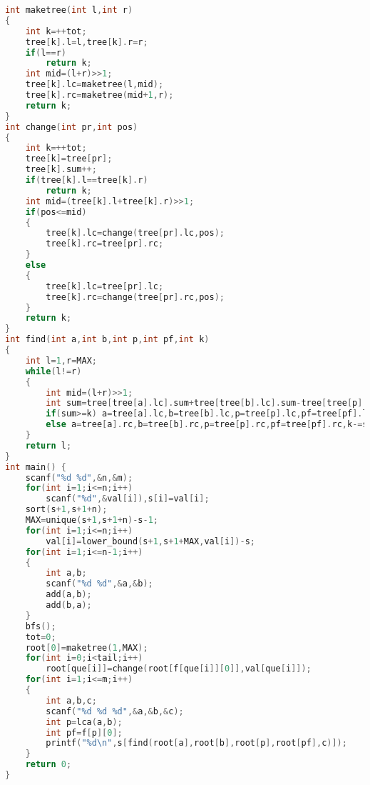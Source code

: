 \begin{lstlisting}[language=c++]
int maketree(int l,int r)
{
    int k=++tot;
    tree[k].l=l,tree[k].r=r;
    if(l==r)
        return k;
    int mid=(l+r)>>1;
    tree[k].lc=maketree(l,mid);    
    tree[k].rc=maketree(mid+1,r);
    return k; 
}
int change(int pr,int pos)
{
    int k=++tot;
    tree[k]=tree[pr];
    tree[k].sum++;
    if(tree[k].l==tree[k].r)
        return k;
    int mid=(tree[k].l+tree[k].r)>>1;
    if(pos<=mid) 
    {
        tree[k].lc=change(tree[pr].lc,pos);
        tree[k].rc=tree[pr].rc;
    }
    else 
    {
        tree[k].lc=tree[pr].lc;
        tree[k].rc=change(tree[pr].rc,pos);
    }
    return k;
}
int find(int a,int b,int p,int pf,int k)
{
    int l=1,r=MAX;
    while(l!=r)
    {
        int mid=(l+r)>>1; 
        int sum=tree[tree[a].lc].sum+tree[tree[b].lc].sum-tree[tree[p].lc].sum-tree[tree[pf].lc].sum;
        if(sum>=k) a=tree[a].lc,b=tree[b].lc,p=tree[p].lc,pf=tree[pf].lc,r=mid;
        else a=tree[a].rc,b=tree[b].rc,p=tree[p].rc,pf=tree[pf].rc,k-=sum,l=mid+1;
    }
    return l;
}
int main() {
    scanf("%d %d",&n,&m);
    for(int i=1;i<=n;i++)
        scanf("%d",&val[i]),s[i]=val[i];
    sort(s+1,s+1+n);
    MAX=unique(s+1,s+1+n)-s-1;
    for(int i=1;i<=n;i++)
        val[i]=lower_bound(s+1,s+1+MAX,val[i])-s;
    for(int i=1;i<=n-1;i++)
    {
        int a,b;
        scanf("%d %d",&a,&b);
        add(a,b);
        add(b,a);
    }
    bfs();
    tot=0;
    root[0]=maketree(1,MAX);
    for(int i=0;i<tail;i++)
        root[que[i]]=change(root[f[que[i]][0]],val[que[i]]);
    for(int i=1;i<=m;i++)
    {
        int a,b,c;
        scanf("%d %d %d",&a,&b,&c);
        int p=lca(a,b);
        int pf=f[p][0];
        printf("%d\n",s[find(root[a],root[b],root[p],root[pf],c)]);
    }
    return 0;
}
    \end{lstlisting}
